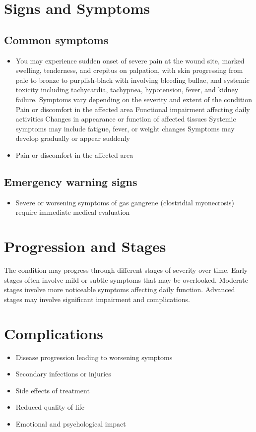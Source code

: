 \section{Signs and Symptoms}

\subsection{Common symptoms}
\begin{itemize}[noitemsep]
  \item You may experience sudden onset of severe pain at the wound site, marked swelling, tenderness, and crepitus on palpation, with skin progressing from pale to bronze to purplish-black with involving bleeding bullae, and systemic toxicity including tachycardia, tachypnea, hypotension, fever, and kidney failure. Symptoms vary depending on the severity and extent of the condition Pain or discomfort in the affected area Functional impairment affecting daily activities Changes in appearance or function of affected tissues Systemic symptoms may include fatigue, fever, or weight changes Symptoms may develop gradually or appear suddenly
  \item Pain or discomfort in the affected area
  \end{itemize}

\subsection{Emergency warning signs}
\begin{itemize}[noitemsep]
  \item Severe or worsening symptoms of gas gangrene (clostridial myonecrosis) require immediate medical evaluation
\end{itemize}
\section{Progression and Stages}
The condition may progress through different stages of severity over time. Early stages often involve mild or subtle symptoms that may be overlooked. Moderate stages involve more noticeable symptoms affecting daily function. Advanced stages may involve significant impairment and complications.
\section{Complications}
\begin{itemize}[noitemsep]
  \item Disease progression leading to worsening symptoms
  \item Secondary infections or injuries
  \item Side effects of treatment
  \item Reduced quality of life
  \item Emotional and psychological impact
\end{itemize}
